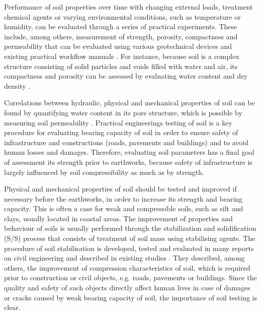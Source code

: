 \documentclass{amestyle}
\begin{document}
Performance of soil properties over time with changing external loads, treatment chemical agents or varying environmental conditions, such as temperature or humidity, can be evaluated through a series of practical experiments. These include, among others, measurement of strength, porosity, compactness and permeability that can be evaluated using various geotechnical devices and existing practical workflow manuals \cite{Day2001,Davis2008}. For instance, because soil is a complex structure consisting of solid particles and voids filled with water and air, its compactness and porosity can be assessed by evaluating water content and dry density \cite{Hillel}. 

Correlations between hydraulic, physical and mechanical properties of soil can be found by quantifying water content in its pore structure, which is possible by measuring soil permeability \cite{BARBOSA2022115673}. Practical engineerings testing of soil is a key procedure for evaluating bearing capacity of soil in order to ensure safety of infrastructure and constructions (roads, pavements and buildings) and to avoid human losses and damages. Therefore, evaluating soil parameters has a final goal of assessment its strength prior to earthworks, because safety of infrastructure is largely influenced by soil compressibility as much as by strength.

Physical and mechanical properties of soil should be tested and improved if necessary before the earthworks, in order to increase its strength and bearing capacity. This is often a case for weak and compressible soils, such as silt and clays, usually located in coastal areas. The improvement of properties and behaviour of soils is usually performed through the stabilization and solidification (S/S) process that consists of treatment of soil mass using stabilising agents. The procedure of soil stabilisation is developed, tested and evaluated in many reports on civil engineering and described in existing studies \cite{Jauberthie,Lindh202102,ArabiWild,Lindh2004}. They described, among others, the improvement of compression characteristics of soil, which is required prior to construction or civil objects, e.g. roads, pavements or buildings. Since the quality and safety of such objects directly affect human lives in case of damages or cracks caused by weak bearing capacity of soil, the importance of soil testing is clear. 
\end{document}
